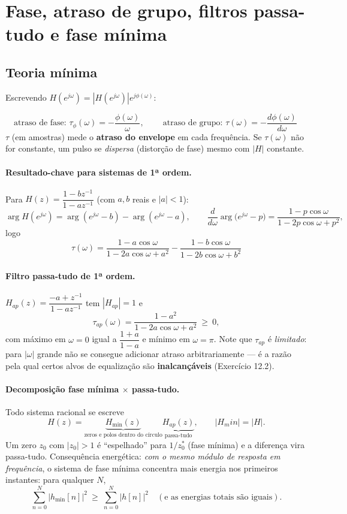 \section{Fase, atraso de grupo, filtros passa-tudo e fase mínima}\label{sec:fase}

\subsection*{Teoria mínima}

Escrevendo $H(e^{j\omega})=|H(e^{j\omega})|e^{j\phi(\omega)}$:

\[
  \text{atraso de fase: } \tau_\phi(\omega)=-\frac{\phi(\omega)}{\omega},
  \qquad
  \boxed{\ \text{atraso de grupo: } \tau(\omega)=-\frac{d\phi(\omega)}{d\omega}\ }
\]
$\tau$ (em amostras) mede o \textbf{atraso do envelope} em cada frequência. Se
$\tau(\omega)$ não for constante, um pulso se \emph{dispersa} (distorção de
fase) mesmo com $|H|$ constante.

\paragraph{Resultado-chave para sistemas de 1ª ordem.} Para
$H(z)=\dfrac{1-bz^{-1}}{1-az^{-1}}$ (com $a,b$ reais e $|a|<1$):
\[
  \arg H(e^{j\omega})=\arg(e^{j\omega}-b)-\arg(e^{j\omega}-a),\qquad
  \frac{d}{d\omega}\arg\bigl(e^{j\omega}-p\bigr)
  =\frac{1-p\cos\omega}{1-2p\cos\omega+p^{2}},
\]
logo
\[
  \boxed{\
  \tau(\omega)=\frac{1-a\cos\omega}{1-2a\cos\omega+a^{2}}
  -\frac{1-b\cos\omega}{1-2b\cos\omega+b^{2}}\ }
\]

\paragraph{Filtro passa-tudo de 1ª ordem.} $H_{ap}(z)=\dfrac{-a+z^{-1}}{1-az^{-1}}$
tem $|H_{ap}|=1$ e
\[
  \tau_{ap}(\omega)=\frac{1-a^{2}}{1-2a\cos\omega+a^{2}}\ \ge\ 0,
\]
com máximo em $\omega=0$ igual a $\dfrac{1+a}{1-a}$ e mínimo em $\omega=\pi$.
Note que $\tau_{ap}$ é \emph{limitado}: para $|\omega|$ grande não se consegue
adicionar atraso arbitrariamente — é a razão pela qual certos alvos de
equalização são \textbf{inalcançáveis} (Exercício 12.2).

\paragraph{Decomposição fase mínima $\times$ passa-tudo.} Todo sistema racional
se escreve
\[
  H(z)=\underbrace{H_{\min}(z)}_{\text{zeros e polos dentro do círculo}}
  \underbrace{H_{ap}(z)}_{\text{passa-tudo}},
  \qquad |H_min|=|H| .
\]
Um zero $z_0$ com $|z_0|>1$ é ``espelhado'' para $1/z_0^*$ (fase mínima) e a
diferença vira passa-tudo. Consequência energética: \emph{com o mesmo módulo
de resposta em frequência}, o sistema de fase mínima concentra mais energia
nos primeiros instantes: para qualquer $N$,
\[
  \sum_{n=0}^{N}|h_{\min}[n]|^{2}\ \ge\ \sum_{n=0}^{N}|h[n]|^{2}
  \quad(\text{e as energias totais são iguais}).
\]

